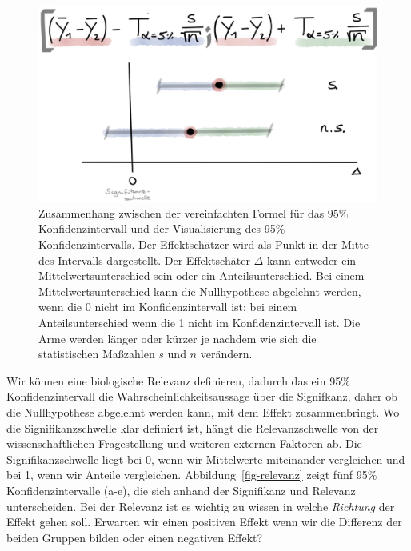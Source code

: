 \documentclass[
  letterpaper,
]{scrbook}
\begin{document}
\begin{figure}

{\centering \includegraphics[width=1\textwidth,height=\textheight]{./images/ci-01.png}

}

\caption{\label{fig-ki-01}Zusammenhang zwischen der vereinfachten Formel
für das 95\% Konfidenzintervall und der Visualisierung des 95\%
Konfidenzintervalls. Der Effektschätzer wird als Punkt in der Mitte des
Intervalls dargestellt. Der Effektschäter \(\Delta\) kann entweder ein
Mittelwertsunterschied sein oder ein Anteilsunterschied. Bei einem
Mittelwertsunterschied kann die Nullhypothese abgelehnt werden, wenn die
0 nicht im Konfidenzintervall ist; bei einem Anteilsunterschied wenn die
1 nicht im Konfidenzintervall ist. Die Arme werden länger oder kürzer je
nachdem wie sich die statistischen Maßzahlen \(s\) und \(n\) verändern.}

\end{figure}

{}

Wir können eine biologische Relevanz definieren, dadurch das ein 95\%
Konfidenzintervall die Wahrscheinlichkeitsaussage über die Signifkanz,
daher ob die Nullhypothese abgelehnt werden kann, mit dem Effekt
zusammenbringt. Wo die Signifikanzschwelle klar definiert ist, hängt die
Relevanzschwelle von der wissenschaftlichen Fragestellung und weiteren
externen Faktoren ab. Die Signifikanzschwelle liegt bei 0, wenn wir
Mittelwerte miteinander vergleichen und bei 1, wenn wir Anteile
vergleichen. Abbildung~\ref{fig-relevanz} zeigt fünf 95\%
Konfidenzintervalle (a-e), die sich anhand der Signifikanz und Relevanz
unterscheiden. Bei der Relevanz ist es wichtig zu wissen in welche
\emph{Richtung} der Effekt gehen soll. Erwarten wir einen positiven
Effekt wenn wir die Differenz der beiden Gruppen bilden oder einen
negativen Effekt?
\end{document}
